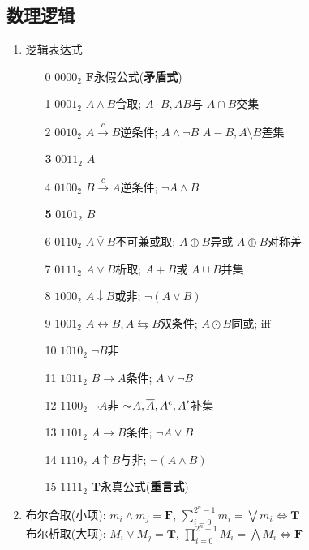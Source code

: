 \subsection{数理逻辑}

\begin{enumerate}

\item 逻辑表达式
\begin{enumerate}
\item[0] $0000_2$ $\bm F$永假公式({\bf 矛盾式})
\item[1] $0001_2$ $A\wedge B$合取; $A\cdot B, AB$与 \hfill $A\cap B$交集
\item[2] $0010_2$ $A\stackrel{c}{\to} B$逆条件; $A\wedge\neg B$ \hfill $A-B,A\setminus B$差集
\item[\bf 3] $0011_2$ $A$
\item[4] $0100_2$ $B\stackrel{c}{\to} A$逆条件; $\neg A\wedge B$
\item[\bf 5] $0101_2$ $B$
\item[6] $0110_2$ $A\bar\vee B$不可兼或取; $A\oplus B$异或 \hfill $A\oplus B$对称差
\item[7] $0111_2$ $A\vee B$析取; $A+B$或 \hfill $A\cup B$并集
\item[8] $1000_2$ $A\downarrow B$或非; $\neg(A\vee B)$
\item[9] $1001_2$ $A\leftrightarrow B, A\leftrightarrows B$双条件; $A\odot B$同或; iff %
\item[10] $1010_2$ $\neg B$非
\item[11] $1011_2$ $B\to A$条件; $A\vee\neg B$
\item[12] $1100_2$ $\neg A$非 \hfill $\sim\! A, \overline{A}, A^{\mathrm{c}}, A'$补集
\item[13] $1101_2$ $A\to B$条件; $\neg A\vee B$
\item[14] $1110_2$ $A\uparrow B$与非; $\neg(A\wedge B)$
\item[15] $1111_2$ $\bm T$永真公式({\bf 重言式})
\end{enumerate}

\item 布尔合取(小项): $m_i\wedge m_j=\bm F$, $\sum_{i=0}^{2^n-1} m_i=\bigvee m_i\Leftrightarrow \bm T$\\
布尔析取(大项): $M_i\vee M_j=\bm T$, $\prod_{i=0}^{2^n-1} M_i=\bigwedge M_i\Leftrightarrow \bm F$


\end{enumerate}
